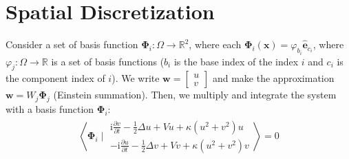 \documentclass{article}
\newcommand{\bvec}[1]{\boldsymbol{#1}}
\newcommand{\brvec}[1]{\mathbf{#1}}
\newcommand{\ii}{\mathrm{i}}
\begin{document}
\newpage

\section{Spatial Discretization}

Consider a set of basis function $\bvec{\Phi}_i : \Omega \rightarrow \mathbb{R}^2$,
where each $\bvec{\Phi}_i(\bvec{x}) = \varphi_{b_i} \hat{\brvec{e}}_{c_i}$,
where $\varphi_j : \Omega \rightarrow \mathbb{R}$ is a set of basis functions
($b_i$ is the base index of the index $i$ and $c_i$ is the component index of $i$).
We write $\bvec{w} = \begin{bmatrix}
    u \\
    v
\end{bmatrix}$ and make the approximation $\bvec{w} = W_j \bvec{\Phi}_j$ (Einstein summation).
Then, we multiply and integrate the system with a basis function $\bvec{\Phi}_i$:
\begin{align*}
    \left< \bvec{\Phi}_i \mid \begin{matrix}
        \ii \frac{\partial v}{\partial t} - \frac{1}{2} \Delta u + V u + \kappa (u^2 + v^2) u \\
        -\ii \frac{\partial u}{\partial t} - \frac{1}{2} \Delta v + V v + \kappa (u^2 + v^2) v
    \end{matrix} \right> = 0
\end{align*}
\end{document}
